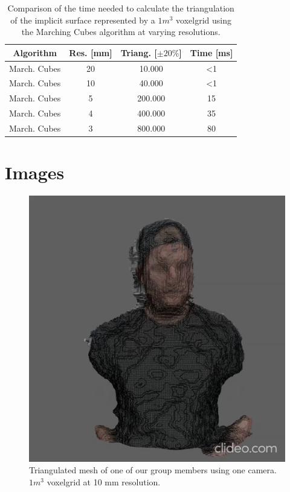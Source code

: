 \documentclass[10pt,twocolumn,letterpaper]{article}
\begin{document}
\begin{table}[h!]
	\begin{center}
		\begin{tabular}{c|c|c|c}
			\textbf{Algorithm} & \textbf{Res. [mm]} & \textbf{Triang. [$\pm 20\%$]}  & \textbf{Time [ms]}\\
			\hline
			March. Cubes & 20  & 10.000   & \textless 1\\
			March. Cubes & 10  & 40.000  & \textless 1\\
			March. Cubes & 5 & 200.000   & 15\\
			March. Cubes & 4 & 400.000   & 35\\
			March. Cubes & 3 & 800.000    & 80\\
		\end{tabular}
		\caption{Comparison of the time needed to calculate the triangulation of the implicit surface represented by a $1m^3$ voxelgrid using the Marching Cubes algorithm at varying resolutions.}
		\label{tab:marching-cubes}
	\end{center}
\end{table}

\clearpage
\section{Images}
\label{sec:images}

\begin{figure}[h!]
	\begin{center}
		\includegraphics[width=0.9\linewidth]{imgs/res2}
	\end{center}
	\caption{Triangulated mesh of one of our group members using one camera. $1m^3$ voxelgrid at 10 mm resolution.}
	\label{fig:wireframe}
\end{figure}
\end{document}
